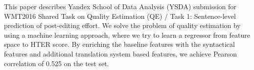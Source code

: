 This paper describes Yandex School of Data Analysis (YSDA) submission for WMT2016 Shared Task on Quality Estimation (QE) / Task 1: Sentence-level prediction of post-editing effort. We solve the problem of quality estimation by using a machine learning approach, where we try to learn a regressor from feature space to HTER score. By enriching the baseline features with the syntactical features and additional translation system based features, we achieve Pearson correlation of 0.525 on the test set.
